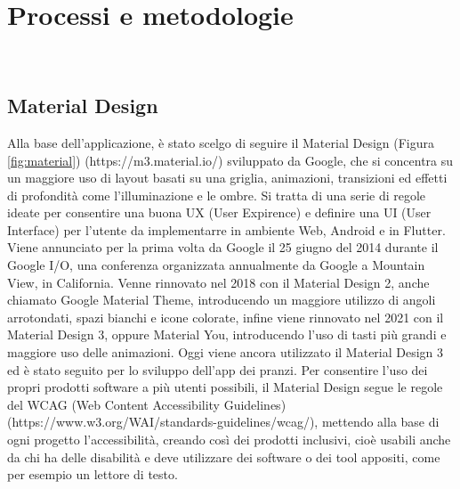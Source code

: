 \chapter{Processi e metodologie}
\label{cap:processi-metodologie}

\\

\section{Material Design}
Alla base dell'applicazione, è stato scelgo di seguire il Material Design (Figura \ref{fig:material}) (https://m3.material.io/) sviluppato da Google, che si concentra su un maggiore uso di layout basati su una griglia, animazioni, transizioni ed effetti di profondità come l'illuminazione e le ombre.\newline
Si tratta di una serie di regole ideate per consentire una buona UX (User Expirence) e definire una UI (User Interface) per l'utente da implementarre in ambiente Web, Android e in Flutter.\newline
Viene annunciato per la prima volta da Google il 25 giugno del 2014 durante il Google I/O, una conferenza organizzata annualmente da Google a Mountain View, in California.\newline
Venne rinnovato nel 2018 con il Material Design 2, anche chiamato Google Material Theme, introducendo un maggiore utilizzo di angoli arrotondati, spazi bianchi e icone colorate, infine viene rinnovato nel 2021 con il Material Design 3, oppure Material You, introducendo l'uso di tasti più grandi e maggiore uso delle animazioni.\newline
Oggi viene ancora utilizzato il Material Design 3 ed è stato seguito per lo sviluppo dell'app dei pranzi.\newline
Per consentire l'uso dei propri prodotti software a più utenti possibili, il Material Design segue le regole del WCAG (Web Content Accessibility Guidelines) (https://www.w3.org/WAI/standards-guidelines/wcag/), mettendo alla base di ogni progetto l'accessibilità, creando così dei prodotti inclusivi, cioè usabili anche da chi ha delle disabilità e deve utilizzare dei software o dei tool appositi, come per esempio un lettore di testo.\newline
